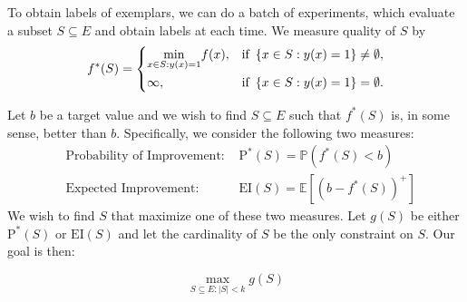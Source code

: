 \documentclass[11pt]{article}
\newcommand{\E}{\mathbb{E}}
\newcommand{\EI}{\mathrm{EI}}
\newcommand{\PI}{\text{P}^*}
\begin{document}
To obtain labels of exemplars, we can do a batch of experiments, which evaluate a subset $S \subseteq E$ and obtain labels at each time. We measure quality of $S$ by
\begin{equation} \label{eq:fS}
f^*(S)= \begin{dcases}
 \underset{x \in S:y(x)=1}{\min} f(x), & \text{if \,} \{x \in S:y(x)=1\} \neq \emptyset, \\
 \infty,  & \text{if \,} \{x \in S:y(x)=1\} = \emptyset.
 \end{dcases}
\end{equation}

%
%

Let $b$ be a target value and we wish to find $S\subseteq E$ such that $f^*(S)$ is, in some sense, better than $b$. Specifically, we consider the following two measures:
\begin{equation} \label{eq:twomeasure}
\begin{aligned}
&\text{Probability of Improvement: }&\PI(S) = \mathbb{P}(f^*(S) < b)\\
&\text{Expected Improvement: }&\EI(S) = \E [(b-f^*(S))^+]
\end{aligned}
\end{equation}
We wish to find $S$ that maximize one of these two measures. Let $g(S)$ be either $\PI(S)$ or $\EI(S)$ and let the cardinality of $S$ be the only constraint on $S$. Our goal is then:

\begin{equation} \label{eq:opt}
\max_{S\subseteq E:|S|<k}g(S)
\end{equation}
\end{document}

